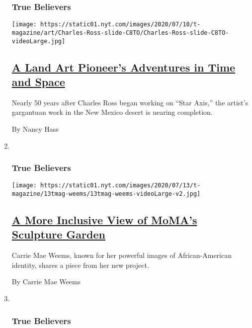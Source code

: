 \begin{enumerate}
{  \subsubsection{True Believers}\label{true-believers-11}}

  \texttt{[image: https://static01.nyt.com/images/2020/07/10/t-magazine/art/Charles-Ross-slide-C8TO/Charles-Ross-slide-C8TO-videoLarge.jpg]}

  \hypertarget{a-land-art-pioneers-adventures-in-time-and-space}{%
  \subsection{\texorpdfstring{\href{/2020/07/21/t-magazine/charles-ross-artist.html}{A
  Land Art Pioneer's Adventures in Time and
  Space}}{A Land Art Pioneer's Adventures in Time and Space}}\label{a-land-art-pioneers-adventures-in-time-and-space}}

  Nearly 50 years after Charles Ross began working on ``Star Axis,'' the
  artist's gargantuan work in the New Mexico desert is nearing
  completion.

  By Nancy Hass
\item ~
  \hypertarget{true-believers-12}{%
  \subsubsection{True Believers}\label{true-believers-12}}

  \texttt{[image: https://static01.nyt.com/images/2020/07/13/t-magazine/13tmag-weems/13tmag-weems-videoLarge-v2.jpg]}

  \hypertarget{a-more-inclusive-view-of-momas-sculpture-garden}{%
  \subsection{\texorpdfstring{\href{/2020/07/21/t-magazine/carrie-mae-weems-moma-garden.html}{A
  More Inclusive View of MoMA's Sculpture
  Garden}}{A More Inclusive View of MoMA's Sculpture Garden}}\label{a-more-inclusive-view-of-momas-sculpture-garden}}

  Carrie Mae Weems, known for her powerful images of African-American
  identity, shares a piece from her new project.

  By Carrie Mae Weems
\item ~
  \hypertarget{true-believers-13}{%
  \subsubsection{True Believers}\label{true-believers-13}}


\end{enumerate}
